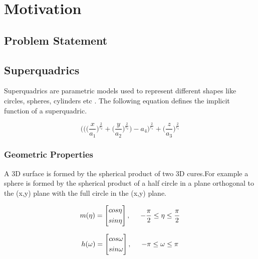 \chapter{Motivation}
\label{chapter:introduction}
\section{Problem Statement}

\section{Superquadrics} Superquadrics are parametric models used to  represent different shapes like  circles, spheres, cylinders etc .
The following  equation defines the implicit function of a superquadric.


\begin{equation}
 \Bigg( \bigg( \Big(\frac{x}{a_{1}}\Big)^{\frac{2}{\epsilon_{2}}} + \Big(\frac{y}{a_{2}}\Big)^{\frac{2}{\epsilon_{2}}} \bigg)  - a_{4} \Bigg)^{\frac{2}{\epsilon_{1}}} + \Big(\frac{z}{a_{3}}\Big)^{\frac{2}{\epsilon_{1}}} 
\end{equation}
\newpage  
\subsection{Geometric Properties}

A 3D surface is formed by the spherical product of two 3D cures.For example a sphere is formed by the spherical product of a half circle in a plane orthogonal to the (x,y) plane with the full circle in the (x,y) plane. 

\begin{equation}
	m(\eta) =\begin{bmatrix}
	cos \eta           \\[0.3em]
	sin \eta  
	\end{bmatrix}, \hspace{5mm} -\frac{\pi}{2}\leq\eta\leq\frac{\pi}{2}
\end{equation}

\begin{equation}
h(\omega) =\begin{bmatrix}
cos \omega           \\[0.3em]
sin \omega 
\end{bmatrix}, \hspace{5mm} -\pi\leq\omega\leq\pi
\end{equation}

